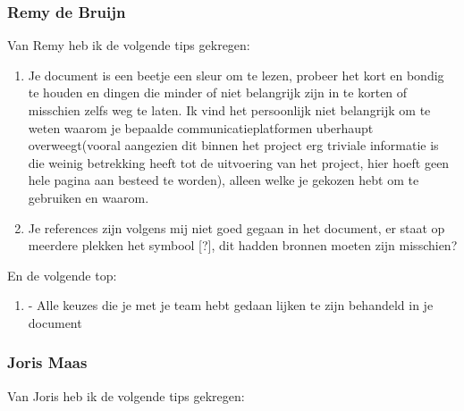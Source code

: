 \documentclass[a4paper]{report}
\begin{document}
\subsubsection{Remy de Bruijn}
Van Remy heb ik de volgende tips gekregen:
\begin{enumerate}
  \item Je document is een beetje een sleur om te lezen, probeer het kort en bondig te houden en dingen die minder of niet belangrijk zijn in te korten of misschien zelfs weg te laten. Ik vind het persoonlijk niet belangrijk om te weten waarom je bepaalde communicatieplatformen uberhaupt overweegt(vooral aangezien dit binnen het project erg triviale informatie is die weinig betrekking heeft tot de uitvoering van het project, hier hoeft geen hele pagina aan besteed te worden), alleen welke je gekozen hebt om te gebruiken en waarom. 
  \item Je references zijn volgens mij niet goed gegaan in het document, er staat op meerdere plekken het symbool [?], dit hadden bronnen moeten zijn misschien?
\end{enumerate}

En de volgende top:
\begin{enumerate}
  \item - Alle keuzes die je met je team hebt gedaan lijken te zijn behandeld in je document
\end{enumerate}

\subsubsection{Joris Maas}
Van Joris heb ik de volgende tips gekregen:
\end{document}
